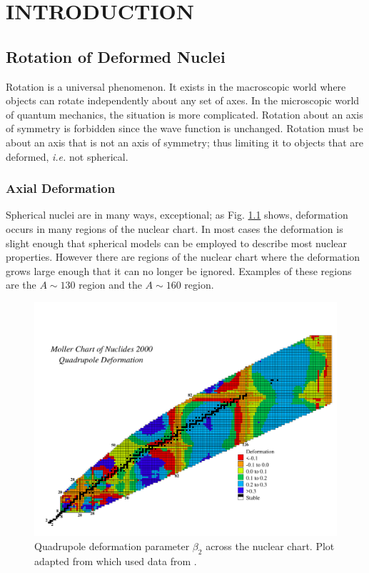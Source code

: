 %
%

\chapter{INTRODUCTION}
\label{chp:intro}
\section{Rotation of Deformed Nuclei}
\label{sec:intro-rot-def-nuc}
Rotation is a universal phenomenon. It exists in the macroscopic world where objects can rotate independently about any set of axes. In the microscopic world of quantum mechanics, the situation is more complicated. Rotation about an axis of symmetry is forbidden since the wave function is unchanged. Rotation must be about an axis that is not an axis of symmetry; thus limiting it to objects that are deformed, \emph{i.e.} not spherical.

\subsection{Axial Deformation}
\label{ssec:intro-rot-axial-def}
Spherical nuclei are in many ways, exceptional; as Fig. \ref{fig:chp1-quad-def} shows, deformation occurs in many regions of the nuclear chart. In most cases the deformation is slight enough that spherical models can be employed to describe most nuclear properties. However there are regions of the nuclear chart where the deformation grows large enough that it can no longer be ignored. Examples of these regions are the $A\sim{}130$ region and the $A\sim{}160$ region.

\begin{figure}[t!]
\centerline{\includegraphics[width=\textwidth,clip=true,trim=0 0 0 75]{./img/c1/chart_thb2.pdf}}
	\caption{Quadrupole deformation parameter $\beta_2$ across the nuclear chart. Plot adapted from \cite{nilssonDiagrams} which used data from \cite{mollerGroundStateDef}.\label{fig:chp1-quad-def}}
\end{figure}

